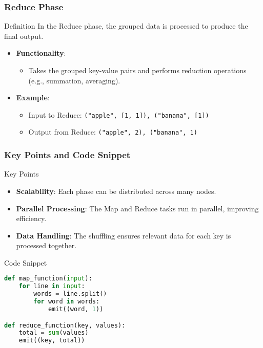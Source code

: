 \documentclass[aspectratio=169]{beamer}
\begin{document}
\begin{frame}[fragile]
    \frametitle{Reduce Phase}
    \begin{block}{Definition}
        In the Reduce phase, the grouped data is processed to produce the final output.
    \end{block}
    \begin{itemize}
        \item \textbf{Functionality}:
        \begin{itemize}
            \item Takes the grouped key-value pairs and performs reduction operations (e.g., summation, averaging).
        \end{itemize}
        \item \textbf{Example}:
        \begin{itemize}
            \item Input to Reduce: \texttt{("apple", [1, 1]), ("banana", [1])}
            \item Output from Reduce: \texttt{("apple", 2), ("banana", 1)}
        \end{itemize}
    \end{itemize}
\end{frame}

\begin{frame}[fragile]
    \frametitle{Key Points and Code Snippet}
    \begin{block}{Key Points}
        \begin{itemize}
            \item \textbf{Scalability}: Each phase can be distributed across many nodes.
            \item \textbf{Parallel Processing}: The Map and Reduce tasks run in parallel, improving efficiency.
            \item \textbf{Data Handling}: The shuffling ensures relevant data for each key is processed together.
        \end{itemize}
    \end{block}
    \begin{block}{Code Snippet}
    \begin{lstlisting}[language=python]
def map_function(input):
    for line in input:               
        words = line.split()   
        for word in words:    
            emit((word, 1))

def reduce_function(key, values):
    total = sum(values)
    emit((key, total))
    \end{lstlisting}
    \end{block}
\end{frame}
\end{document}

